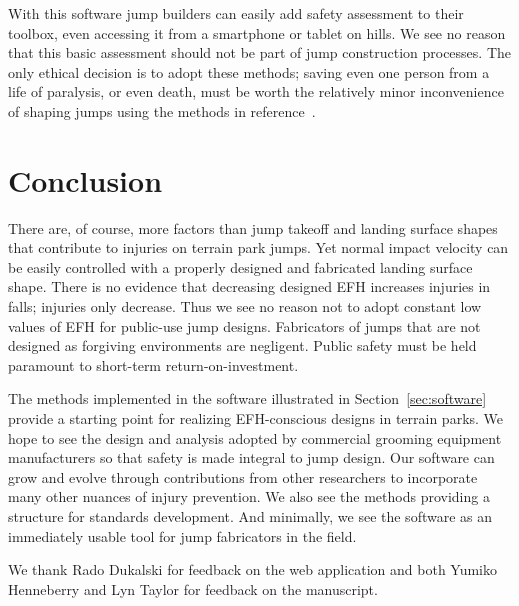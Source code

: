 \documentclass[smallextended]{svjour3}       %
\begin{document}
With this software jump builders can easily add
safety assessment to their toolbox, even accessing it from a smartphone or
tablet on hills.  We see no reason that this basic assessment should not be
part of jump construction processes. The only ethical decision is to adopt
these methods; saving even one person from a life of paralysis, or even death,
must be worth the relatively minor inconvenience of shaping jumps using the
methods in reference~\cite{Levy2015}.


\section{Conclusion}
\label{sec:conc}
%
There are, of course, more factors than jump takeoff and landing surface shapes
that contribute to injuries on terrain park jumps. Yet normal impact velocity
can be easily controlled with a properly designed and fabricated landing
surface shape. There is no evidence that decreasing designed EFH increases
injuries in falls; injuries only decrease. Thus we see no reason not to adopt
constant low values of EFH for public-use jump designs. Fabricators of jumps that are not
designed as forgiving environments are negligent. Public safety must be held paramount to short-term
return-on-investment.

The methods implemented in the software illustrated in
Section~\ref{sec:software} provide a starting point for realizing EFH-conscious
designs in terrain parks. We hope to see the design and analysis adopted by
commercial grooming equipment manufacturers so that safety is made integral to
jump design. Our software can grow and evolve through contributions from other
researchers to incorporate many other nuances of injury prevention. We also see
the methods providing a structure for standards development. And minimally, we
see the software as an immediately usable tool for jump fabricators in the
field.

\begin{acknowledgements}
  We thank Rado Dukalski for feedback on the web application and both Yumiko
  Henneberry and Lyn Taylor for feedback on the manuscript.
\end{acknowledgements}
\end{document}
